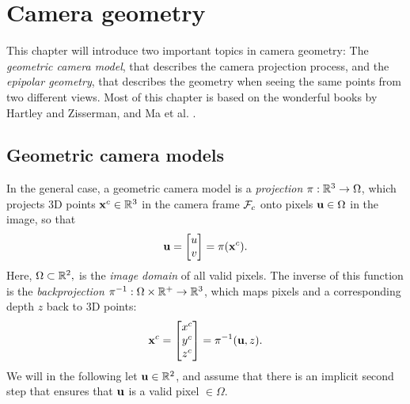 \chapter{Camera geometry}
This chapter will introduce two important topics in camera geometry: The \emph{geometric camera model}, that describes the camera projection process, and the \emph{epipolar geometry}, that describes the geometry when seeing the same points from two different views.
Most of this chapter is based on the wonderful books by Hartley and Zisserman, and Ma et al. \cite{Hartley2004MultipleVision, Ma2004AnModels}.

\section{Geometric camera models}
In the general case, a geometric camera model is a  \emph{projection} $\pi: {\mathbb R}^3 \to \Omega$, which projects 3D points ${\boldsymbol{\mathbf{x}}}^c \in {\mathbb R}^3$ in the camera frame $\mathcal{F}_c$ onto pixels ${\boldsymbol{\mathbf{u}}} \in \Omega$ in the image, so that
\begin{equation}
  {\boldsymbol{\mathbf{u}}} = 
  \begin{bmatrix}
  u\\
  v
  \end{bmatrix}
  = \pi({\boldsymbol{\mathbf{x}}}^c).
\end{equation}
Here, $\Omega \subset {\mathbb R}^2,$ is the \emph{image domain} of all valid pixels.
The inverse of this function is the \emph{backprojection} $\pi^{-1}: \Omega \times {\mathbb R}^+ \to {\mathbb R}^3$, which maps pixels and a corresponding depth $z$ back to 3D points:
\begin{equation}
  {\boldsymbol{\mathbf{x}}}^c =
  \begin{bmatrix}
  x^c\\
  y^c\\
  z^c
  \end{bmatrix}
  = \pi^{-1}({\boldsymbol{\mathbf{u}}}, z).
\end{equation}
We will in the following let ${\boldsymbol{\mathbf{u}}} \in {\mathbb R}^2$, and assume that there is an implicit second step that ensures that ${\boldsymbol{\mathbf{u}}}$ is a valid pixel $\in \Omega$.

